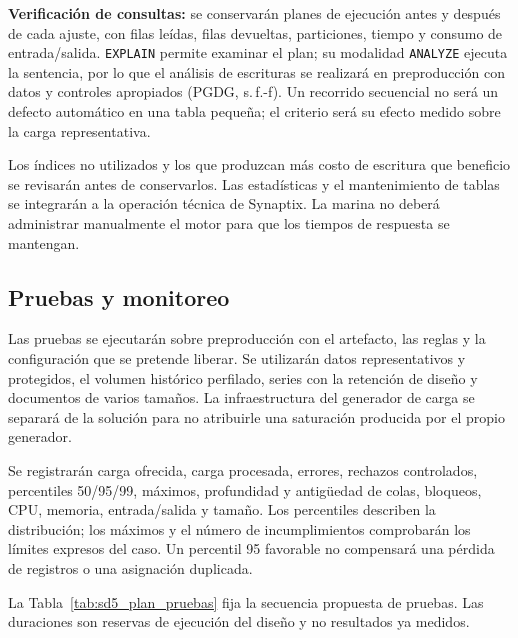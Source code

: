 \textbf{Verificación de consultas:} se conservarán planes de ejecución antes y después de cada ajuste, con filas leídas, filas devueltas, particiones, tiempo y consumo de entrada/salida. \texttt{EXPLAIN} permite examinar el plan; su modalidad \texttt{ANALYZE} ejecuta la sentencia, por lo que el análisis de escrituras se realizará en preproducción con datos y controles apropiados (PGDG, s.\,f.-f). Un recorrido secuencial no será un defecto automático en una tabla pequeña; el criterio será su efecto medido sobre la carga representativa.

Los índices no utilizados y los que produzcan más costo de escritura que beneficio se revisarán antes de conservarlos. Las estadísticas y el mantenimiento de tablas se integrarán a la operación técnica de Synaptix. La marina no deberá administrar manualmente el motor para que los tiempos de respuesta se mantengan.

\subsection{Pruebas y monitoreo}
\label{subsec:sd5_pruebas_desempeno}

Las pruebas se ejecutarán sobre preproducción con el artefacto, las reglas y la configuración que se pretende liberar. Se utilizarán datos representativos y protegidos, el volumen histórico perfilado, series con la retención de diseño y documentos de varios tamaños. La infraestructura del generador de carga se separará de la solución para no atribuirle una saturación producida por el propio generador.

Se registrarán carga ofrecida, carga procesada, errores, rechazos controlados, percentiles 50/95/99, máximos, profundidad y antigüedad de colas, bloqueos, CPU, memoria, entrada/salida y tamaño. Los percentiles describen la distribución; los máximos y el número de incumplimientos comprobarán los límites expresos del caso. Un percentil 95 favorable no compensará una pérdida de registros o una asignación duplicada.

La Tabla~\ref{tab:sd5_plan_pruebas} fija la secuencia propuesta de pruebas. Las duraciones son reservas de ejecución del diseño y no resultados ya medidos.

